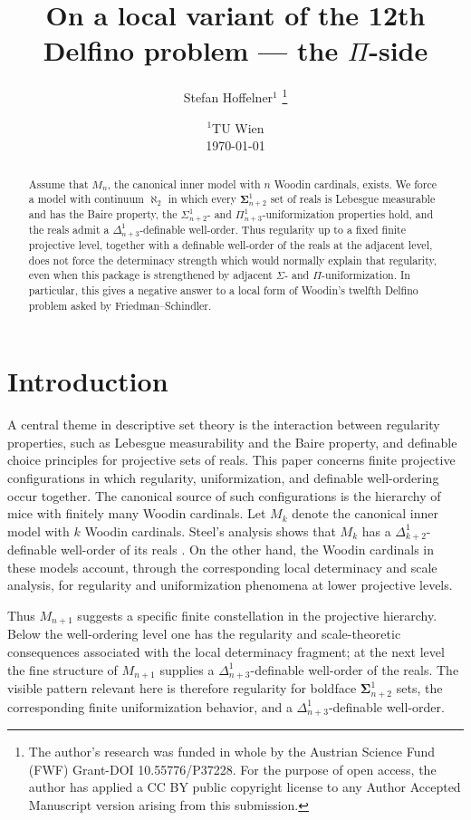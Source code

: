 \documentclass[a4paper,11pt]{article}
\title{On a local variant of the 12th Delfino problem --- the $\Pi$-side}
\author{ Stefan Hoffelner$^{1}$  \footnote{The author's research was funded in whole by the Austrian Science Fund (FWF) Grant-DOI 10.55776/P37228. For the purpose of open access, the author has applied a CC BY public copyright license to any Author Accepted Manuscript version arising from this submission. }  }
\date{
    $^1$TU Wien \\
    \today
}
\begin{document}
\maketitle


\begin{abstract}
Assume that \(M_n\), the canonical inner model with \(n\) Woodin cardinals,
exists.  We force a model with continuum \(\aleph_2\) in which every
\(\boldsymbol{\Sigma}^1_{n+2}\) set of reals is Lebesgue measurable and has the
Baire property, the \(\Sigma^1_{n+2}\)- and
\(\Pi^1_{n+3}\)-uniformization properties hold, and the reals admit a
\(\Delta^1_{n+3}\)-definable well-order.  Thus regularity up to a fixed finite
projective level, together with a definable well-order of the reals at the
adjacent level, does not force the determinacy strength which would normally
explain that regularity, even when this package is strengthened by adjacent
\(\Sigma\)- and \(\Pi\)-uniformization.  In particular, this gives a negative
answer to a local form of Woodin's twelfth Delfino problem asked by Friedman--Schindler.
\end{abstract}


\section{Introduction}\label{sec:introduction}


A central theme in descriptive set theory is the interaction between
regularity properties, such as Lebesgue measurability and the Baire
property, and definable choice principles for projective sets of reals.
This paper concerns finite projective configurations in which regularity,
uniformization, and definable well-ordering occur together.  The canonical
source of such configurations is the hierarchy of mice with finitely many
Woodin cardinals.  Let \(M_k\) denote the canonical inner model with \(k\)
Woodin cardinals.  Steel's analysis shows that \(M_k\) has a
\(\Delta^1_{k+2}\)-definable well-order of its reals
\cite{Steel2,Steel3}.  On the other hand, the Woodin cardinals in these
models account, through the corresponding local determinacy and scale
analysis, for regularity and uniformization phenomena at lower projective
levels.

Thus \(M_{n+1}\) suggests a specific finite constellation in the
projective hierarchy.  Below the well-ordering level one has the
regularity and scale-theoretic consequences associated with the local
determinacy fragment; at the next level the fine structure of \(M_{n+1}\)
supplies a \(\Delta^1_{n+3}\)-definable well-order of the reals.  The
visible pattern relevant here is therefore regularity for boldface
\(\boldsymbol\Sigma^1_{n+2}\) sets, the corresponding finite
uniformization behavior, and a \(\Delta^1_{n+3}\)-definable well-order.
\end{document}
